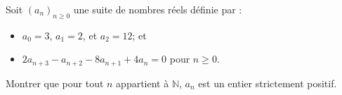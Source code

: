 \documentclass[varwidth]{standalone}
\begin{document}
    Soit $(a_n)_{n \geq 0}$ une suite de nombres r\'eels d\'efinie par :
    \begin{itemize}
        \item $a_0 = 3$, $a_1 = 2$, et $a_2 = 12$; et
        \item $2a_{n + 3} - a_{n + 2} - 8a_{n + 1} + 4a_n = 0$ pour $n \geq 0$.
    \end{itemize}
    Montrer que pour tout $n$ appartient \`a $\mathbb{N}$, $a_n$ est un entier strictement positif.
\end{document}
